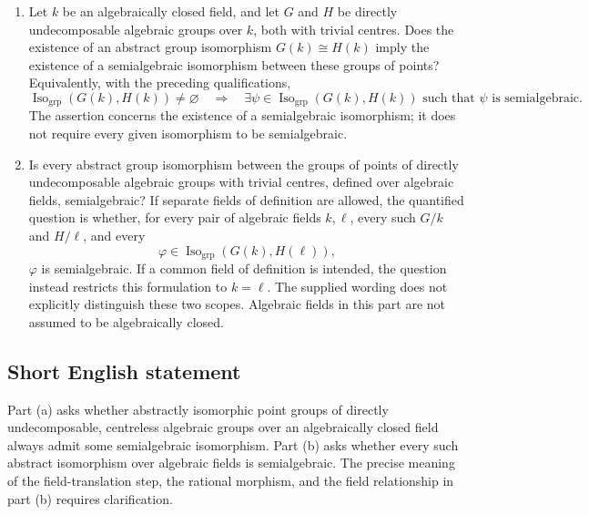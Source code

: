 \documentclass[11pt]{article}
\begin{document}
\begin{enumerate}
\item[(a)] Let \(k\) be an algebraically closed field, and let \(G\) and \(H\) be directly undecomposable algebraic groups over \(k\), both with trivial centres. Does the existence of an abstract group isomorphism \(G(k)\cong H(k)\) imply the existence of a semialgebraic isomorphism between these groups of points? Equivalently, with the preceding qualifications,
\[
\operatorname{Iso}_{\mathrm{grp}}(G(k),H(k))\ne\varnothing
\quad\Longrightarrow\quad
\exists\psi\in\operatorname{Iso}_{\mathrm{grp}}(G(k),H(k))
\text{ such that }\psi\text{ is semialgebraic}.
\]
The assertion concerns the existence of a semialgebraic isomorphism; it does not require every given isomorphism to be semialgebraic.
\item[(b)] Is every abstract group isomorphism between the groups of points of directly undecomposable algebraic groups with trivial centres, defined over algebraic fields, semialgebraic? If separate fields of definition are allowed, the quantified question is whether, for every pair of algebraic fields \(k,\ell\), every such \(G/k\) and \(H/\ell\), and every
\[
\varphi\in\operatorname{Iso}_{\mathrm{grp}}(G(k),H(\ell)),
\]
\(\varphi\) is semialgebraic. If a common field of definition is intended, the question instead restricts this formulation to \(k=\ell\). The supplied wording does not explicitly distinguish these two scopes. Algebraic fields in this part are not assumed to be algebraically closed.
\end{enumerate}
\subsection{Short English statement}
Part (a) asks whether abstractly isomorphic point groups of directly undecomposable, centreless algebraic groups over an algebraically closed field always admit some semialgebraic isomorphism. Part (b) asks whether every such abstract isomorphism over algebraic fields is semialgebraic. The precise meaning of the field-translation step, the rational morphism, and the field relationship in part (b) requires clarification.
\end{document}
